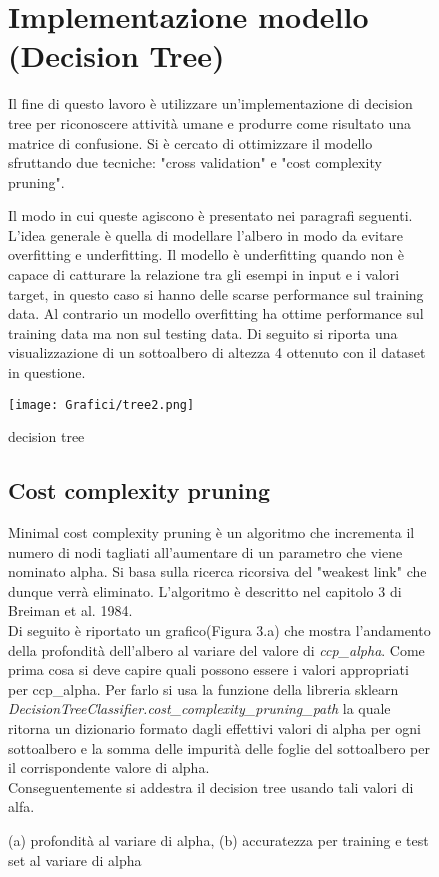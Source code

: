 \documentclass[]{article}
\begin{document}
\begin{figure}
\section{Implementazione modello (Decision Tree)}
Il fine di questo lavoro è utilizzare un'implementazione di decision tree per riconoscere attività umane e produrre come risultato una matrice di confusione. 
Si è cercato di ottimizzare il modello sfruttando due tecniche: "cross validation" e "cost complexity pruning".\\

\end{figure}
\begin{figure}
Il modo in cui queste agiscono è presentato nei paragrafi seguenti. L'idea generale è quella di modellare l'albero in modo da evitare overfitting e underfitting. Il modello è underfitting quando non è capace di catturare la relazione tra gli esempi in input e i valori target, in questo caso si hanno delle scarse performance sul training data. Al contrario un modello overfitting ha ottime performance sul training data ma non sul testing data.
Di seguito si riporta una visualizzazione di un sottoalbero di altezza 4 ottenuto con il dataset in questione.
\\
\begin{center}
\texttt{[image: Grafici/tree2.png]} 
\caption{decision tree}
\end{center}


\subsection{Cost complexity pruning}
Minimal cost complexity pruning è un algoritmo che incrementa il numero di nodi tagliati all'aumentare di un parametro che viene nominato alpha. Si basa sulla ricerca ricorsiva del "weakest link" che dunque verrà eliminato. L'algoritmo è descritto nel capitolo 3 di Breiman et al. 1984. \\
Di seguito è riportato un grafico(Figura 3.a) che mostra l'andamento della profondità dell'albero al variare del valore di \textit{ccp\_alpha}.
Come prima cosa si deve capire quali possono essere i valori appropriati per ccp\_alpha. Per farlo si usa la funzione della libreria sklearn \textit{DecisionTreeClassifier.cost\_complexity\_pruning\_path} la quale ritorna un dizionario formato dagli effettivi valori di alpha per ogni sottoalbero e la somma delle impurità delle foglie del sottoalbero per il corrispondente valore di alpha.\\
Conseguentemente si addestra il decision tree usando tali valori di alfa. 
\begin{center}
\hspace*{\fill}
\caption{(a) profondità al variare di alpha, (b) accuratezza per training e test set al variare di alpha}
\end{center}
\end{figure}
\end{document}

